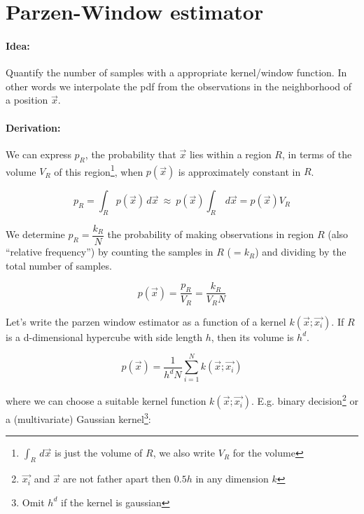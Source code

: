 
\section*{Parzen-Window estimator}
\paragraph{Idea:} Quantify the number of samples with a appropriate kernel/window function. In other words we interpolate
the pdf from the observations in the neighborhood of a position $\vec{x}$.

\paragraph{Derivation:} We can express $p_R$, the probability that $\vec{x}$ lies within a region $R$, in terms of the volume $V_R$ of this region\footnote{$\int_R \,d\vec{x}$ is just the volume of $R$, we also write $V_R$ for the volume}, when $p(\vec{x})$ is approximately constant in $R$.

\begin{equation*}
  p_R = \int_R p(\vec{x}) \,d\vec{x} \ \approx \ p(\vec{x}) \int_R \,d\vec{x} = p(\vec{x}) V_R
\end{equation*}

We determine $p_R = \dfrac{k_R}{N}$ the probability of making observations in region $R$ (also ``relative frequency'')  by counting the samples in $R$ ($=k_R$) and dividing by the total number of samples.

\begin{equation*}
  p(\vec{x}) = \dfrac{p_R}{V_R} = \dfrac{k_R}{V_R N}
\end{equation*}

Let's write the parzen window estimator as a function of a kernel $k(\vec{x}; \vec{x_i})$. If $R$ is a d-dimensional hypercube with side length $h$, then its volume is $h^d$.

\begin{equation*}
  \boxed{p(\vec{x}) = \dfrac{1}{h^d N} \sum_{i=1}^N k(\vec{x}; \vec{x_i})}
\end{equation*}

where we can choose a suitable kernel function $k(\vec{x}; \vec{x_i})$. E.g. binary decision\footnote{$\vec{x_i}$ and $\vec{x}$ are not father apart then $0.5 h$ in any dimension $k$} or a (multivariate) Gaussian kernel\footnote{Omit $h^d$ if the kernel is gaussian}:

